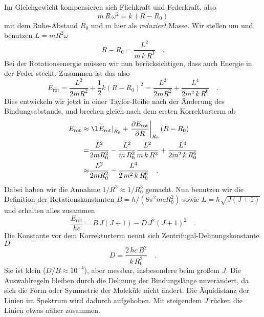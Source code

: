 Im Gleichgewicht kompensieren sich Fliehkraft und Federkraft, also
\begin{equation}
 m \, R \, \omega^2 = k \, ( R - R_0)
\end{equation} 
mit dem Ruhe-Abstand $R_0$ und $m$ hier als \emph{reduziert} Masse. Wir stellen um und benutzen $L = m R^2 \omega$
\begin{equation}
R - R_0 = \frac{L^2}{m \, k \, R^3  }  \quad .
\end{equation}
Bei der Rotationsenergie müssen wir nun berücksichtigen, dass auch Energie in der Feder steckt. Zusammen ist das also 
\begin{equation}
 E_\text{rot} = \frac{L^2}{2 m R^2}  + \frac{1}{2} k ( R - R_0)^2 = 
\frac{L^2}{2 m R^2}  + \frac{L^4}{2 m^2 \, k \, R^6  }  \quad .
\end{equation}
Dies entwickeln wir jetzt in einer Taylor-Reihe nach der Änderung des Bindungsabstands, und brechen gleich nach dem ersten Korrekturterm ab
\begin{align}
 E_\text{rot} \approx &
 \left. \l E_\text{rot}  \right|_{R_0}  
  + \left. \frac{\partial E_\text{rot}}{\partial R}
 \right|_{R_0}  (R - R_0) \\
 = & \frac{L^2}{2 m R_0^2}  -  \frac{L^2}{m \, R_0^3  }   \frac{L^2}{m \, k \, R^3  }  + \frac{L^4}{2 m^2 \, k \, R_0^6  } \\ 
  \approx & \frac{L^2}{2 m R_0^2}  -  \frac{L^4}{2 \, m^2 \, k\, R_0^6  }    \quad .
\end{align}
Dabei haben wir die  Annahme $1/R^3 \approx 1 / R_0^3$ gemacht.
Nun benutzen wir die Definition der Rotationskonstanten $B = h / (8 \pi^2  m  c R_0^2)$ sowie $L = \hbar \sqrt{ J (J+1)}$ und erhalten alles zusammen
\begin{equation}
\frac{ E_\text{rot}}{h c} = B \, J (J+1) - D \, J^2 (J+1)^2 \quad .
\end{equation}
Die Konstante vor dem Korrekturterm nennt sich Zentrifugal-Dehnungskonstante $D$
\begin{equation}
D = \frac{2 \, h c \, B^2}{k \, R_0^2} \quad .
\end{equation}
Sie ist klein ($D/B \approx 10^{-4}$), aber messbar, insbesondere beim großem $J$. Die Auswahlregeln bleiben durch die Dehnung der Bindungslänge unverändert, da sich die Form oder Symmetrie der Moleküle nicht ändert. Die Äquidistanz der Linien im Spektrum wird dadurch aufgehoben. Mit steigendem $J$ rücken die Linien etwas näher zusammen.


